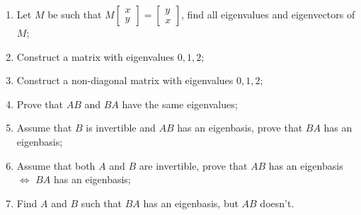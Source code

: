 \documentclass{article}
\begin{document}
\begin{enumerate}
    \item Let $M$ be such that $M \begin{bmatrix} x \\ y\end{bmatrix} = \begin{bmatrix} y \\ x \end{bmatrix}$, find all eigenvalues and eigenvectors of $M$;
    \item Construct a matrix with eigenvalues $0, 1, 2$;
    \item Construct a non-diagonal matrix with eigenvalues $0,1,2$;
    \item Prove that $AB$ and $BA$ have the same eigenvalues;
    \item Assume that $B$ is invertible and $AB$ has an eigenbasis, prove that $BA$ has an eigenbasis;
    \item Assume that both $A$ and $B$ are invertible, prove that $AB$ has an eigenbasis $\iff$ $BA$ has an eigenbasis;
    \item Find $A$ and $B$ such that $BA$ has an eigenbasis, but $AB$ doesn't.
\end{enumerate}
\end{document}
